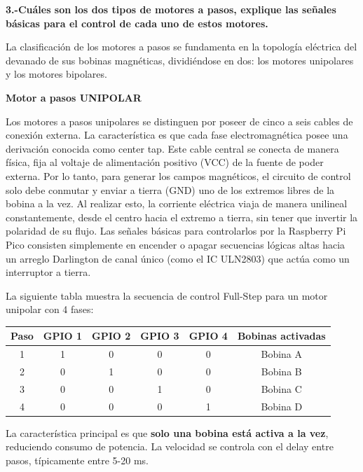 \documentclass[letterpaper,12pt]{article}
\begin{document}
    \newpage
    \noindent\textbf{3.-Cuáles son los dos tipos de motores a pasos, explique las señales básicas para el control de cada uno de estos motores.}

    La clasificación de los motores a pasos se fundamenta en la topología eléctrica del devanado de sus bobinas magnéticas,
    dividiéndose en dos: los motores unipolares y los motores bipolares.

    \textbf{Motor a pasos UNIPOLAR}

    Los motores a pasos unipolares se distinguen por poseer de cinco a seis cables de conexión externa.
    La característica es que cada fase electromagnética posee una derivación conocida como center tap.
    Este cable central se conecta de manera física, fija al voltaje de alimentación positivo (VCC) de la fuente de poder externa.
    Por lo tanto, para generar los campos magnéticos, el circuito de control solo debe conmutar y enviar a tierra (GND)
    uno de los extremos libres de la bobina a la vez. Al realizar esto, la corriente eléctrica viaja de manera unilineal constantemente,
    desde el centro hacia el extremo a tierra, sin tener que invertir la polaridad de su flujo.
    Las señales básicas para controlarlos por la Raspberry Pi Pico consisten simplemente en encender o apagar secuencias lógicas
    altas hacia un arreglo Darlington de canal único (como el IC ULN2803) que actúa como un interruptor a tierra.

    La siguiente tabla muestra la secuencia de control Full-Step para un motor unipolar con 4 fases:

    \begin{center}
    \begin{tabular}{|c|c|c|c|c|c|}
    \hline
    \textbf{Paso} & \textbf{GPIO 1} & \textbf{GPIO 2} & \textbf{GPIO 3} & \textbf{GPIO 4} & \textbf{Bobinas activadas} \\
    \hline
    1 & 1 & 0 & 0 & 0 & Bobina A \\
    \hline
    2 & 0 & 1 & 0 & 0 & Bobina B \\
    \hline
    3 & 0 & 0 & 1 & 0 & Bobina C \\
    \hline
    4 & 0 & 0 & 0 & 1 & Bobina D \\
    \hline
    \end{tabular}
    \end{center}

    La característica principal es que \textbf{solo una bobina está activa a la vez}, reduciendo consumo de potencia. La velocidad se controla con el delay entre pasos, típicamente entre 5-20 ms.
\end{document}
